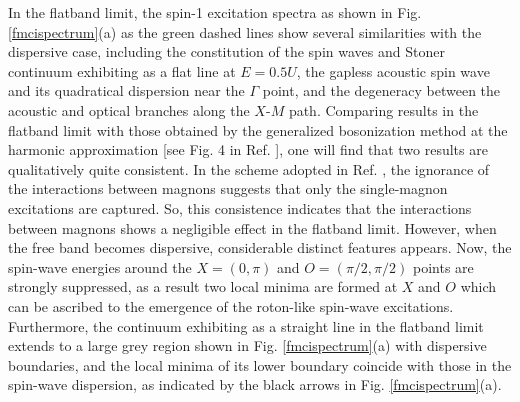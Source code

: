 \documentclass[amsmath,superscriptaddress,showpacs,aps,prb,twocolumn]{revtex4-1}
\begin{document}
\par In the flatband limit, the spin-1 excitation spectra as shown in Fig. \ref{fmcispectrum}(a) as the green dashed lines show several similarities with the dispersive case, including the constitution of the spin waves and Stoner continuum exhibiting as a flat line at $E=0.5U$, the gapless acoustic spin wave and its quadratical dispersion  near the $\Gamma$ point, and the degeneracy between the acoustic and optical branches along the $X$-$M$ path. Comparing results in the flatband limit with those obtained by the generalized bosonization method at the harmonic approximation [see Fig. 4 in Ref. \cite{DG_PRB2015}], one will find that two results are qualitatively quite consistent. In the scheme adopted in Ref. \cite{DG_PRB2015}, the ignorance of the interactions between magnons suggests that only the single-magnon excitations are captured. So, this consistence indicates that the interactions between magnons shows a negligible effect in the flatband limit. However, when the free band becomes dispersive, considerable distinct features appears. Now, the spin-wave energies around the $X=(0,\pi)$ and $O=(\pi/2,\pi/2)$ points are strongly suppressed, as a result two local minima are formed at $X$ and $O$ which can be ascribed to the emergence of the roton-like spin-wave excitations. Furthermore, the continuum exhibiting as a straight line in the flatband limit extends to a large grey region shown in Fig. \ref{fmcispectrum}(a) with dispersive boundaries, and the local minima of its lower boundary coincide with those in the spin-wave dispersion, as indicated by the black arrows in Fig. \ref{fmcispectrum}(a).
\end{document}

